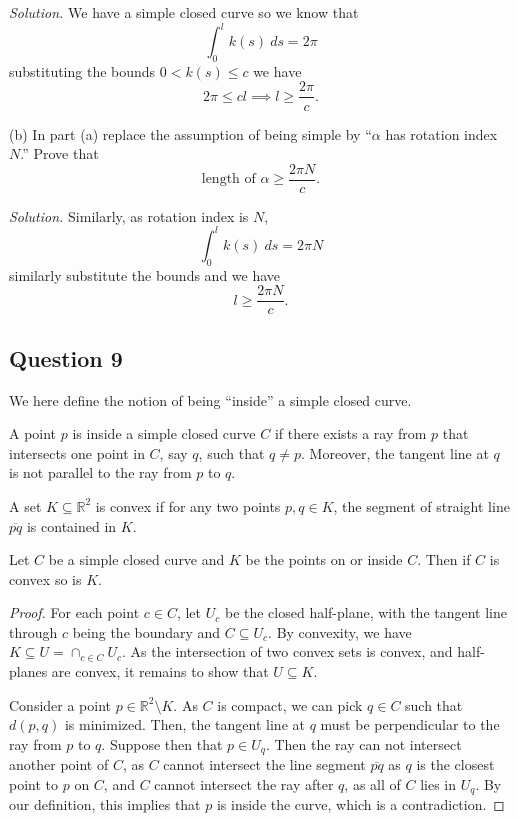 \documentclass[12pt]{article}
\begin{document}
\textit{Solution.}
We have a simple closed curve so we know that
\[ \int_0^l k(s)\ ds = 2\pi \]
substituting the bounds \(0<k(s)\leq c\) we have
\[ 2\pi \leq cl \implies l \geq \frac{2\pi}c. \]

(b) In part (a) replace the assumption of being simple by ``\(\alpha\) has rotation index \(N\).'' Prove that
\[ \text{length of }\alpha \geq \frac{2\pi N}c. \]

\textit{Solution.}
Similarly, as rotation index is \(N\),
\[ \int_0^l k(s)\ ds = 2\pi N \]
similarly substitute the bounds and we have
\[ l \geq \frac{2\pi N}c. \]

\subsection*{Question 9}

We here define the notion of being ``inside'' a simple closed curve.

\begin{definition}
    A point $p$ is inside a simple closed curve $C$ if there
    exists a ray from $p$ that intersects one point in $C$, say $q$,
    such that $q \neq p$. Moreover, the tangent line at $q$
    is not parallel to the ray from $p$ to $q$.
\end{definition}

\begin{theorem}
    A set $K \subseteq \mathbb R^2$ is convex
    if for any two points $p, q \in K$, the segment of 
    straight line $\overline{pq}$ is contained in $K$. 

    Let $C$ be a simple closed curve and $K$ be the points on or inside $C$.
    Then if $C$ is convex so is $K$.
\end{theorem}

\begin{proof}
    For each point $c \in C$, let $U_c$ be the closed half-plane, 
    with the tangent line through $c$ being the boundary and
    $C \subseteq U_c$. By convexity, we have $K \subseteq U = \cap_{c \in C} U_c.$
    As the intersection of two convex sets is convex, and half-planes are convex,
    it remains to show that $U \subseteq K$.

    Consider a point $p \in \mathbb{R}^2 \setminus K$.
    As $C$ is compact, we can pick $q \in C$ such that $d(p, q)$ is minimized.
    Then, the tangent line at $q$ must be perpendicular to the ray from $p$ to $q$.
    Suppose then that $p \in U_q$. Then the ray can not intersect another point of $C$,
    as $C$ cannot intersect the line segment $\overline{pq}$ as $q$ is the closest point to $p$ on $C$,
    and $C$ cannot intersect the ray after $q$, as all of $C$ lies in $U_q.$
    By our definition, this implies that $p$ is inside the curve, which is a contradiction.
\end{proof}
\end{document}
